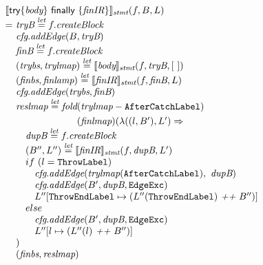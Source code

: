 \[\begin{array}{l@{}l@{~}l}
\lefteqn{\transfun{\ircfgtryfin{\emph{body}}{\emph{finIR}}}_{\emph{stmt}}(f, B, L)}\\
& = & \emph{tryB} \letval f.\emph{createBlock}\\
& & \emph{cfg}.\emph{addEdge}(B, \emph{tryB})\\
& & \emph{finB} \letval f.\emph{createBlock}\\
& & (\emph{trybs}, \emph{trylmap}) \letval \transfun{\emph{body}}_{\emph{stmt}}(f, \emph{tryB}, [\ ])\\
& & (\emph{finbs}, \emph{finlamp}) \letval \transfun{\emph{finIR}}_{\emph{stmt}}(f, \emph{finB}, L)\\
& & \emph{cfg}.\emph{addEdge}(\emph{trybs}, \emph{finB})\\
& & \emph{reslmap} \letval \fold(\emph{trylmap} - \AfterCatchLabel)\\
& & \phantom{\emph{reslmap} \letval \fold}(\emph{finlmap})
(\lambda((l, B'), L') \Rightarrow \\
& & \quad \emph{dupB} \letval f.\emph{createBlock}\\
& & \quad (B'', L'') \letval \transfun{\emph{finIR}}_{\emph{stmt}}(f, \emph{dupB}, L')\\
& & \quad if\ (l = \ThrowLabel)\\
& & \quad \phantom{if} \emph{cfg}.\emph{addEdge}(\emph{trylmap}(\AfterCatchLabel),\ \emph{dupB})\\
& & \quad \phantom{if} \emph{cfg}.\emph{addEdge}(B', \emph{dupB}, \EdgeExc)\\
& & \quad \phantom{if} L''[\ThrowEndLabel \mapsto (L''(\ThrowEndLabel) ~\emph{++}~ B'')]
~~~~~~~~~~~~~~~~\\
& & \quad else\\
& & \quad \phantom{if} \emph{cfg}.\emph{addEdge}(B', \emph{dupB}, \EdgeExc)\\
& & \quad \phantom{if} L''[l \mapsto (L''(l) ~\emph{++}~ B'')]\\
& & )\\
& & (\emph{finbs}, \emph{reslmap})\\
& & \\

\end{array}
\]

